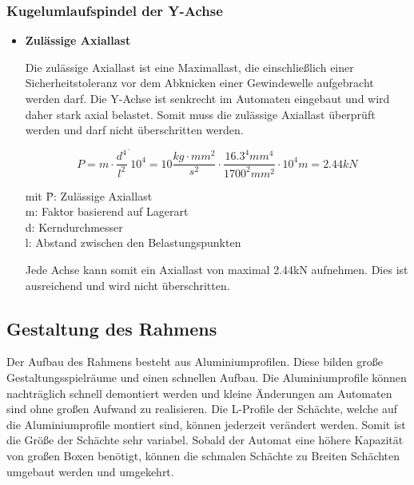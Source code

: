 \documentclass{scrartcl}
\begin{document}
\subsubsection{Kugelumlaufspindel der Y-Achse}


\begin{itemize}

\item \textbf{Zulässige Axiallast}

Die zulässige Axiallast ist eine Maximallast, die einschließlich einer Sicherheitstoleranz vor dem 	Abknicken einer Gewindewelle aufgebracht werden darf. Die Y-Achse ist senkrecht im Automaten eingebaut und wird daher stark axial belastet.
Somit muss die zulässige Axiallast überprüft werden und darf nicht überschritten werden.
	 		
\[P=m\cdot \dfrac{d^4}{l^2}^\cdot 10^4=10\dfrac{kg\cdot mm^2}{s^2}\cdot \dfrac{16.3^4mm^4}{1700^2mm^2}\cdot 10^4m=2.44kN\]


\begin{tabbing}
mit \=P: Zulässige Axiallast\\
		\>m: Faktor basierend auf Lagerart\\
		\>d: Kerndurchmesser\\
		\>l: Abstand zwischen den Belastungspunkten\\
\end{tabbing}

Jede Achse kann somit ein Axiallast von maximal 2.44kN aufnehmen. Dies ist ausreichend und wird nicht überschritten.


\end{itemize}








\subsection{Gestaltung des Rahmens}

Der Aufbau des Rahmens besteht aus Aluminiumprofilen. Diese bilden große Gestaltungsspielräume und einen schnellen Aufbau. Die Aluminiumprofile können nachträglich schnell demontiert werden und kleine Änderungen am Automaten sind ohne großen Aufwand zu realisieren. Die L-Profile der Schächte, welche auf die Aluminiumprofile montiert sind, können jederzeit verändert werden. Somit ist die Größe der Schächte sehr variabel. Sobald der Automat eine höhere Kapazität von großen Boxen benötigt, können die schmalen Schächte zu Breiten Schächten umgebaut werden und umgekehrt.\\
\end{document}
